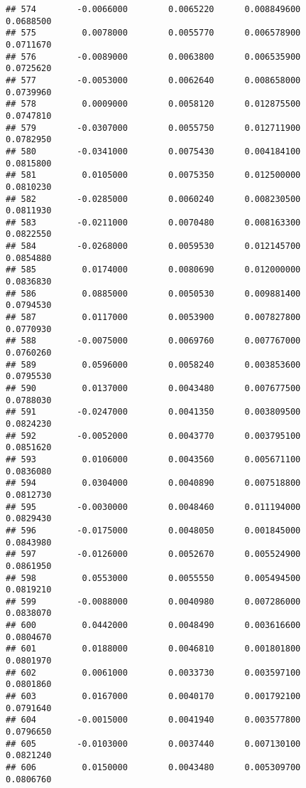 \documentclass[
]{article}
\begin{document}
\begin{verbatim}
## 574        -0.0066000        0.0065220      0.008849600             0.0688500
## 575         0.0078000        0.0055770      0.006578900             0.0711670
## 576        -0.0089000        0.0063800      0.006535900             0.0725620
## 577        -0.0053000        0.0062640      0.008658000             0.0739960
## 578         0.0009000        0.0058120      0.012875500             0.0747810
## 579        -0.0307000        0.0055750      0.012711900             0.0782950
## 580        -0.0341000        0.0075430      0.004184100             0.0815800
## 581         0.0105000        0.0075350      0.012500000             0.0810230
## 582        -0.0285000        0.0060240      0.008230500             0.0811930
## 583        -0.0211000        0.0070480      0.008163300             0.0822550
## 584        -0.0268000        0.0059530      0.012145700             0.0854880
## 585         0.0174000        0.0080690      0.012000000             0.0836830
## 586         0.0885000        0.0050530      0.009881400             0.0794530
## 587         0.0117000        0.0053900      0.007827800             0.0770930
## 588        -0.0075000        0.0069760      0.007767000             0.0760260
## 589         0.0596000        0.0058240      0.003853600             0.0795530
## 590         0.0137000        0.0043480      0.007677500             0.0788030
## 591        -0.0247000        0.0041350      0.003809500             0.0824230
## 592        -0.0052000        0.0043770      0.003795100             0.0851620
## 593         0.0106000        0.0043560      0.005671100             0.0836080
## 594         0.0304000        0.0040890      0.007518800             0.0812730
## 595        -0.0030000        0.0048460      0.011194000             0.0829430
## 596        -0.0175000        0.0048050      0.001845000             0.0843980
## 597        -0.0126000        0.0052670      0.005524900             0.0861950
## 598         0.0553000        0.0055550      0.005494500             0.0819210
## 599        -0.0088000        0.0040980      0.007286000             0.0838070
## 600         0.0442000        0.0048490      0.003616600             0.0804670
## 601         0.0188000        0.0046810      0.001801800             0.0801970
## 602         0.0061000        0.0033730      0.003597100             0.0801860
## 603         0.0167000        0.0040170      0.001792100             0.0791640
## 604        -0.0015000        0.0041940      0.003577800             0.0796650
## 605        -0.0103000        0.0037440      0.007130100             0.0821240
## 606         0.0150000        0.0043480      0.005309700             0.0806760

\end{verbatim}
\end{document}
